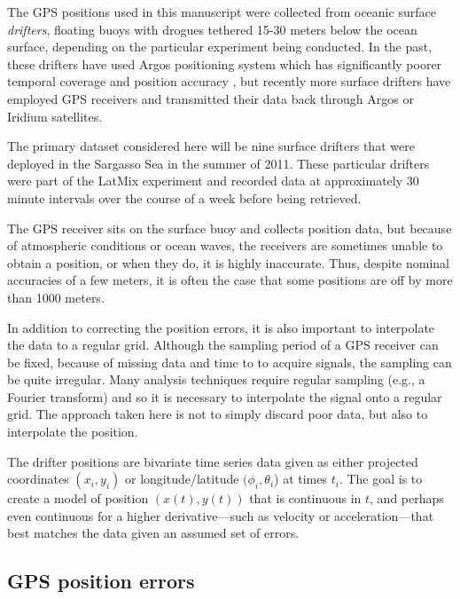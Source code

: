 \documentclass[10pt,journal]{IEEEtran}
\begin{document}
The GPS positions used in this manuscript were collected from oceanic surface \emph{drifters}, floating buoys with drogues tethered 15-30 meters below the ocean surface, depending on the particular experiment being conducted. In the past, these drifters have used Argos positioning system which has significantly poorer temporal coverage and position accuracy \cite{elipot2016-jgr}, but recently more surface drifters have employed GPS receivers and transmitted their data back through Argos or Iridium satellites.

The primary dataset considered here will be nine surface drifters that were deployed in the Sargasso Sea in the summer of 2011. These particular drifters were part of the LatMix experiment \cite{shcherbina2015-bams} and recorded data at approximately 30 minute intervals over the course of a week before being retrieved.

The GPS receiver sits on the surface buoy and collects position data, but because of atmospheric conditions or ocean waves, the receivers are sometimes unable to obtain a position, or when they do, it is highly inaccurate. Thus, despite nominal accuracies of a few meters, it is often the case that some positions are off by more than 1000 meters.

In addition to correcting the position errors, it is also important to interpolate the data to a regular grid. Although the sampling period of a GPS receiver can be fixed, because of missing data and time to to acquire signals, the sampling can be quite irregular.  Many analysis techniques require regular sampling (e.g., a Fourier transform) and so it is necessary to interpolate the signal onto a regular grid. The approach taken here is not to simply discard poor data, but also to interpolate the position.



The drifter positions are bivariate time series data given as either projected coordinates $(x_i, y_i)$ or longitude/latitude $(\phi_i, \theta_i$) at times $t_i$. The goal is to create a model of position $(x(t),y(t))$ that is continuous in $t$, and perhaps even continuous for a higher derivative---such as velocity or acceleration---that best matches the data given an assumed set of errors.
\subsection{GPS position errors}
\label{gps_position_errors}
\end{document}
